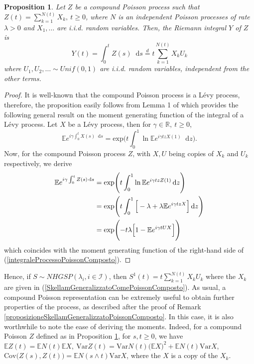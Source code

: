 \documentclass[12pt, twoside, english, headsepline]{article}
\newcommand*\dif{\mathop{}\!\mathrm{d}}  %
\newtheorem{proposition}{Proposition}[section] %
\theoremstyle{definition} %
\numberwithin{equation}{section} %
\begin{document}
\begin{proposition}\label{proposizioneIntegraleProcessoPoissonComposto}
Let $Z$ be a compound Poisson process such that  $Z(t) = \sum_{k=1}^{N(t)}  X_k,\ t\ge0$, where $N$ is an independent Poisson processes of rate $\lambda>0$ and $X_1,\dots$ are i.i.d. random variables. Then, the Riemann integral $Y$ of $Z$ is
\begin{equation}\label{integraleProcessoPoissonComposto}
Y(t) = \int_0^t Z(s)\dif s \stackrel{d}{=} t\sum_{k=1}^{N(t)} X_kU_k
\end{equation}
where $U_1,U_2,\dots\sim Unif(0,1)$ are i.i.d. random variables, independent from the other terms.
\end{proposition}

\begin{proof}
It is well-known that the compound Poisson process is a L\'{e}vy process, therefore, the proposition easily follows from Lemma 1 of \cite{X2018} which provides the following general result on the moment generating function of the integral of a L\'{e}vy process. Let $X$ be a L\'{e}vy process, then for $\gamma\in\mathbb{R},\ t\ge0$,
\begin{equation}
\mathbb{E}e^{i\gamma \int_0^t X(s)\dif s} = \text{exp}\Biggl( t \int_0^1 \ln \mathbb{E} e^{i\gamma t z X(1)}\dif z \Biggr).
\end{equation}
Now, for the compound Poisson process $Z$, with $X,U$ being copies of $X_k$ and $U_k$ respectively, we derive
\begin{align*}
\mathbb{E}e^{i\gamma \int_0^t Z(s)\dif s}&=  \text{exp}\Biggl( t \int_0^1 \ln \mathbb{E} e^{i\gamma t z Z(1)}\dif z \Biggr) \\
&=  \text{exp}\Biggl( t \int_0^1\Big[-\lambda + \lambda \mathbb{E} e^{i\gamma  t z X}\Bigr] \dif z \Biggr)\\
& =  \text{exp}\Biggl( -t \lambda \Bigl[1- \mathbb{E} e^{i\gamma t UX} \Bigr]\Biggr)
\end{align*}
which coincides with the moment generating function of the right-hand side of (\ref{integraleProcessoPoissonComposto}).
\end{proof}

Hence, if $S\sim NHGSP (\lambda_i, i\in \mathcal{I} )$, then $S^1(t) =  t\sum_{k=1}^{N(t)} X_kU_k$ where the $X_k$ are given in (\ref{SkellamGeneralizzatoComePoissonComposto}). As usual, a compound Poisson representation can be extremely useful to obtain further properties of the process, as described after the proof of Remark \ref{proposizioneSkellamGeneralizzatoPoissonComposto}. In this case, it is also worthwhile to note the ease of deriving the moments. Indeed, for a compound Poisson $Z$ defined as in Proposition \ref{proposizioneIntegraleProcessoPoissonComposto}, for $s,t\ge0$, we have $\mathbb{E}Z(t) = \mathbb{E}N(t)\mathbb{E}X,\ \text{Var}Z(t) = \text{Var}N(t)\big(\mathbb{E}X\big)^2 + \mathbb{E}N(t)\text{Var}X$, $\text{Cov}\big(Z(s),Z(t)\big) = \mathbb{E}N(s\wedge t)\text{Var} X$, where the $X$ is a copy of the $X_k$.
\end{document}
